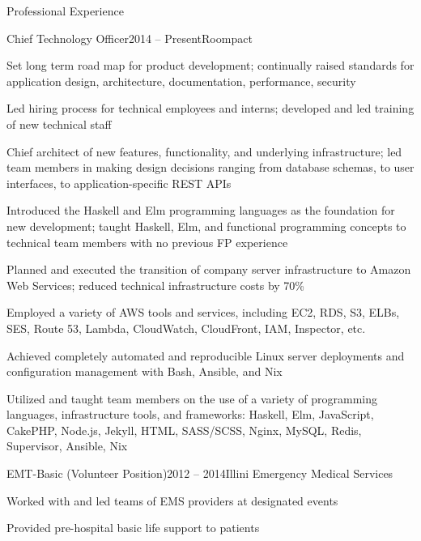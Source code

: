 \documentclass{resume} %
\begin{document}

\begin{rSection}{Professional Experience}
\begin{rSubsection}{Chief Technology Officer}{2014 -- Present}{Roompact}{}
\item Set long term road map for product development; continually raised standards for application design, architecture, documentation, performance, security
\item Led hiring process for technical employees and interns; developed and led training of new technical staff
\item Chief architect of new features, functionality, and underlying infrastructure; led team members in making design decisions ranging from database schemas,  to user interfaces, to application-specific REST APIs
\item Introduced the Haskell and Elm programming languages as the foundation for new development; taught Haskell, Elm, and functional programming concepts to technical team members with no previous FP experience
\item Planned and executed the transition of company server infrastructure to Amazon Web Services; reduced technical infrastructure costs by 70\%
\item Employed a variety of AWS tools and services, including EC2, RDS, S3, ELBs, SES, Route 53, Lambda, CloudWatch, CloudFront, IAM, Inspector, etc.
\item Achieved completely automated and reproducible Linux server deployments and configuration management with Bash, Ansible, and Nix
\item Utilized and taught team members on the use of a variety of programming languages, infrastructure tools, and frameworks: Haskell, Elm, JavaScript, CakePHP, Node.js, Jekyll, HTML, SASS/SCSS, Nginx, MySQL, Redis, Supervisor, Ansible, Nix
\end{rSubsection}


\begin{rSubsection}{EMT-Basic (Volunteer Position)}{2012 -- 2014}{Illini Emergency Medical Services}{}
\item Worked with and led teams of EMS providers at designated events
\item Provided pre-hospital basic life support to patients
\end{rSubsection}


\end{rSection}
\end{document}
